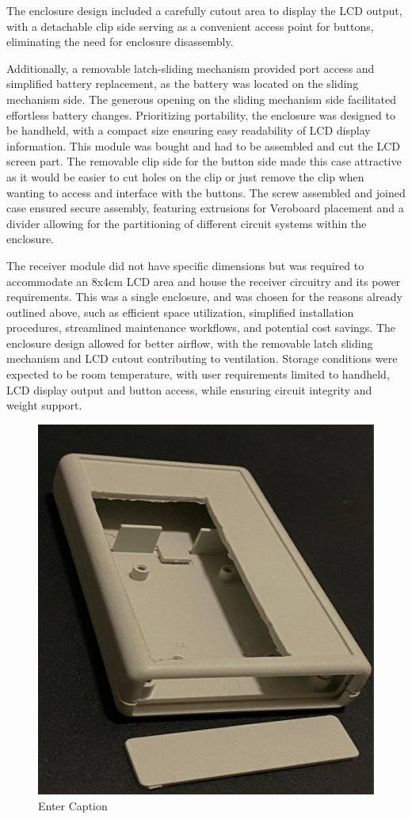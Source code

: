 \documentclass[class=report,11pt,crop=false]{standalone}
\begin{document}
The enclosure design included a carefully cutout area to display the LCD output, with a detachable clip side serving as a convenient access point for buttons, eliminating the need for enclosure disassembly. 
\newline

Additionally, a removable latch-sliding mechanism provided port access and simplified battery replacement, as the battery was located on the sliding mechanism side. The generous opening on the sliding mechanism side facilitated effortless battery changes. Prioritizing portability, the enclosure was designed to be handheld, with a compact size ensuring easy readability of LCD display information. This module was bought and had to be assembled and cut the LCD screen part. The removable clip side for the button side made this case attractive as it would be easier to cut holes on the clip or just remove the clip when wanting to access and interface with the buttons. The screw assembled and joined case ensured secure assembly, featuring extrusions for Veroboard placement and a divider allowing for the partitioning of different circuit systems within the enclosure.
\newline

The receiver module did not have specific dimensions but was required to accommodate an 8x4cm LCD area and house the receiver circuitry and its power requirements. This was a single enclosure, and was chosen for the reasons already outlined above, such as efficient space utilization, simplified installation procedures, streamlined maintenance workflows, and potential cost savings. The enclosure design allowed for better airflow, with the removable latch sliding mechanism and LCD cutout contributing to ventilation. Storage conditions were expected to be room temperature, with user requirements limited to handheld, LCD display output and button access, while ensuring circuit integrity and weight support.


 
\begin{figure}[H]
    \centering
    \includegraphics[width=0.30\linewidth]{final-report/Images/receiver_house.png}
    \caption{Enter Caption}
    \label{fig:enter-label}
\end{figure}
\end{document}
